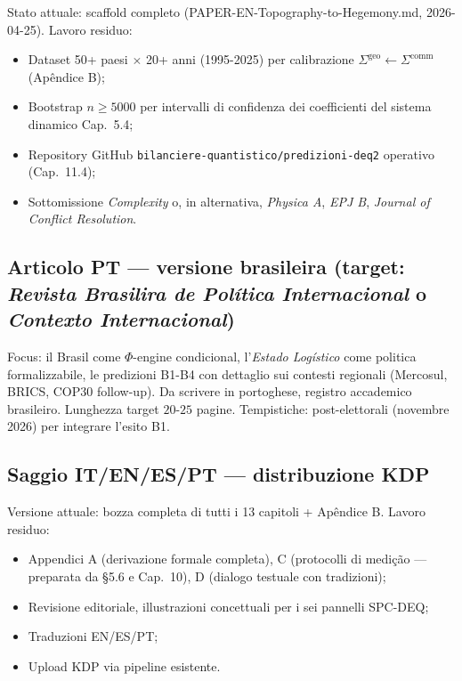 Stato attuale: scaffold completo (PAPER-EN-Topography-to-Hegemony.md,
2026-04-25). Lavoro residuo:

\begin{itemize}
\tightlist
\item
  Dataset 50+ paesi $\times$ 20+ anni (1995-2025) per calibrazione
  \(\Sigma^{\text{geo}} \leftarrow \Sigma^{\text{comm}}\) (Apêndice B);
\item
  Bootstrap \(n \geq 5000\) per intervalli di confidenza dei
  coefficienti del sistema dinamico Cap.~5.4;
\item
  Repository GitHub \texttt{bilanciere-quantistico/predizioni-deq2}
  operativo (Cap.~11.4);
\item
  Sottomissione \emph{Complexity} o, in alternativa, \emph{Physica A},
  \emph{EPJ B}, \emph{Journal of Conflict Resolution}.
\end{itemize}

\subsection{\texorpdfstring{Articolo PT --- versione brasileira (target:
\emph{Revista Brasilira de Política Internacional} o \emph{Contexto
Internacional})}{Articolo PT --- versione brasileira (target: Revista Brasilira de Política Internacional o Contexto Internacional)}}\label{articolo-pt-versione-brasileira-target-revista-brasileira-de-poluxedtica-internacional-o-contexto-internacional}

Focus: il Brasil come \(\Phi\)-engine condicional, l'\emph{Estado
Logístico} come politica formalizzabile, le predizioni B1-B4 con
dettaglio sui contesti regionali (Mercosul, BRICS, COP30 follow-up). Da
scrivere in portoghese, registro accademico brasileiro. Lunghezza target
\(20\)-\(25\) pagine. Tempistiche: post-elettorali (novembre 2026) per
integrare l'esito B1.

\subsection{Saggio IT/EN/ES/PT --- distribuzione
KDP}\label{saggio-itenespt-distribuzione-kdp}

Versione attuale: bozza completa di tutti i 13 capitoli + Apêndice B.
Lavoro residuo:

\begin{itemize}
\tightlist
\item
  Appendici A (derivazione formale completa), C (protocolli di
  medição --- preparata da \S{}5.6 e Cap.~10), D (dialogo testuale con
  tradizioni);
\item
  Revisione editoriale, illustrazioni concettuali per i sei pannelli
  SPC-DEQ;
\item
  Traduzioni EN/ES/PT;
\item
  Upload KDP via pipeline esistente.
\end{itemize}



